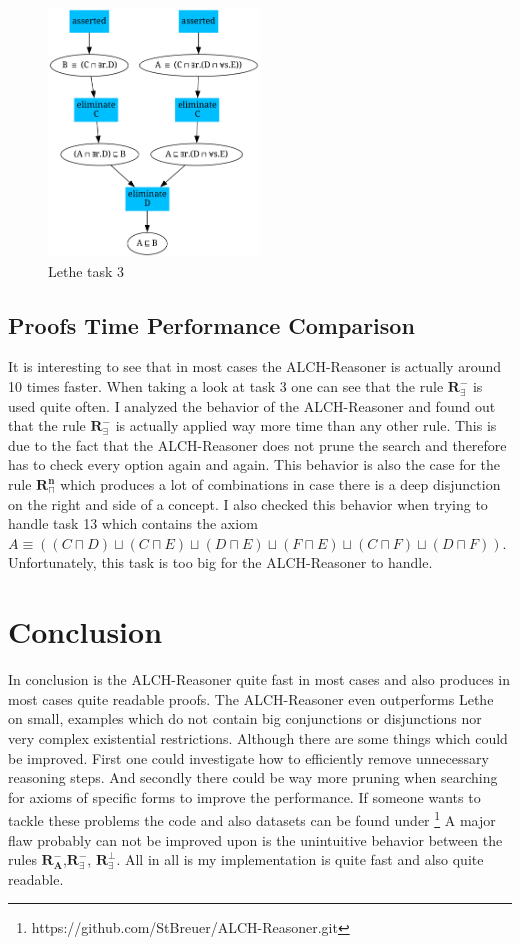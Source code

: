 \documentclass[titlepage]{article}
\begin{document}
\begin{figure}
  \centering
  \includegraphics[width=0.5\textwidth]{pictures/Lehte_task00003.png}
  \caption{Lethe task 3}
  \label{fig:lethe_3}
\end{figure}

\subsection{Proofs Time Performance Comparison}
It is interesting to see that in most cases the ALCH-Reasoner is actually around 10 times faster.
When taking a look at task 3 one can see that the rule $\mathbf{R^{-}_{\exists}}$ is used quite often.
I analyzed the behavior of the ALCH-Reasoner and found out that the rule $\mathbf{R^{-}_{\exists}}$ is actually 
applied way more time than any other rule. This is due to the fact that the ALCH-Reasoner does not prune the search
and therefore has to check every option again and again. This behavior is also the case for the rule $\mathbf{R^{n}_{\sqcap}}$ which
produces a lot of combinations in case there is a deep disjunction on the right and side of a concept.
 I also checked this behavior when trying to handle task 13 which contains the axiom
 $A \equiv ((C \sqcap D) \sqcup (C \sqcap E) \sqcup (D \sqcap E) \sqcup (F \sqcap E) \sqcup (C \sqcap F) \sqcup (D \sqcap F))$.
 Unfortunately, this task is too big for the ALCH-Reasoner to handle.


\section{Conclusion}
In conclusion is the ALCH-Reasoner quite fast in most cases and also produces in most cases
quite readable proofs. The ALCH-Reasoner even outperforms Lethe on small, examples which do not
contain big conjunctions or disjunctions nor very complex existential restrictions.
Although there are some things which could be improved.
First one could investigate how to efficiently remove unnecessary reasoning steps.
And secondly there could be way more pruning when searching for axioms of specific forms to improve the performance.
If someone wants to tackle these problems the code and also datasets can be found under \footnote{https://github.com/StBreuer/ALCH-Reasoner.git}
A major flaw probably can not be improved upon is the unintuitive behavior between the 
rules $\mathbf{R^{-}_A}$,$\mathbf{R^{-}_{\exists}}$, $\mathbf{R^\bot_{\exists}}$.
All in all is my implementation is quite fast and also quite readable.

\printbibliography
\end{document}
